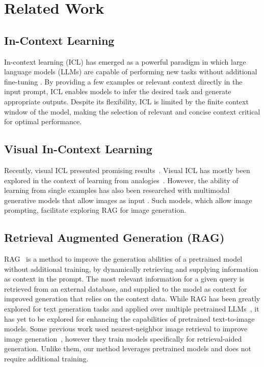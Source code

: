 \section{Related Work}
\label{sec:prior_work}

\subsection{In-Context Learning}

In-context learning (ICL) has emerged as a powerful paradigm in which large language models (LLMs) are capable of performing new tasks without additional fine-tuning \cite{brown2020language}. By providing a few examples or relevant context directly in the input prompt, ICL enables models to infer the desired task and generate appropriate outputs.
Despite its flexibility, ICL is limited by the finite context window of the model, making the selection of relevant and concise context critical for optimal performance.

\vspace{-6pt}
\subsection{Visual In-Context Learning}\vspace{-2pt}

Recently, visual ICL presented promising results~\cite{gu2024analogist,wang2023context,xiao2024omnigen,najdenkoska2024context, sun2024generative}.
Visual ICL has mostly been explored in the context of learning from analogies~\cite{gu2024analogist, wang2023context, xiao2024omnigen, nguyen2024visual}.
However, the ability of learning from single examples has also been researched with multimodal generative models that allow images as input \cite{xiao2024omnigen, sun2024generative, wanggenartist}. 
Such models, which allow image prompting, facilitate exploring RAG for image generation.

\vspace{-4pt}
\subsection{Retrieval Augmented Generation (RAG)}
RAG~\cite{lewis2020retrieval} is a method to improve the generation abilities of a pretrained model without additional training, by dynamically retrieving and supplying information as context in the prompt. 
The most relevant information for a given query is retrieved from an external database, and supplied to the model as context for improved generation that relies on the context data.
While RAG has been greatly explored for text generation tasks and applied over multiple pretrained LLMs~\cite{lewis2020retrieval,gao2023retrieval,ram2023context,zhang2025aidrivensignlanguagegeneration}, it has yet to be explored for enhancing the capabilities of pretrained text-to-image models.
Some previous work used nearest-neighbor image retrieval to improve image generation~\cite{sheyninknn, blattmann2022retrieval, chenre, hu2024instruct}, however they train models specifically for retrieval-aided generation. Unlike them, our method leverages pretrained models and does not require additional training.

